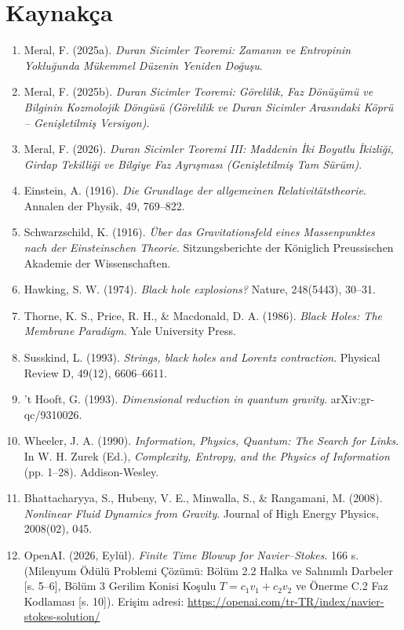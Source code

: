\documentclass[12pt,a4paper]{article}
\begin{document}
\section*{Kaynakça}

\begin{enumerate}
    \item Meral, F. (2025a). \textit{Duran Sicimler Teoremi: Zamanın ve Entropinin Yokluğunda Mükemmel Düzenin Yeniden Doğuşu}.
    \item Meral, F. (2025b). \textit{Duran Sicimler Teoremi: Görelilik, Faz Dönüşümü ve Bilginin Kozmolojik Döngüsü (Görelilik ve Duran Sicimler Arasındaki Köprü – Genişletilmiş Versiyon)}.
    \item Meral, F. (2026). \textit{Duran Sicimler Teoremi III: Maddenin İki Boyutlu İkizliği, Girdap Tekilliği ve Bilgiye Faz Ayrışması (Genişletilmiş Tam Sürüm)}.
    \item Einstein, A. (1916). \textit{Die Grundlage der allgemeinen Relativitätstheorie}. Annalen der Physik, 49, 769–822.
    \item Schwarzschild, K. (1916). \textit{Über das Gravitationsfeld eines Massenpunktes nach der Einsteinschen Theorie}. Sitzungsberichte der Königlich Preussischen Akademie der Wissenschaften.
    \item Hawking, S. W. (1974). \textit{Black hole explosions?} Nature, 248(5443), 30–31.
    \item Thorne, K. S., Price, R. H., \& Macdonald, D. A. (1986). \textit{Black Holes: The Membrane Paradigm}. Yale University Press.
    \item Susskind, L. (1993). \textit{Strings, black holes and Lorentz contraction}. Physical Review D, 49(12), 6606–6611.
    \item ’t Hooft, G. (1993). \textit{Dimensional reduction in quantum gravity}. arXiv:gr-qc/9310026.
    \item Wheeler, J. A. (1990). \textit{Information, Physics, Quantum: The Search for Links}. In W. H. Zurek (Ed.), \textit{Complexity, Entropy, and the Physics of Information} (pp. 1–28). Addison-Wesley.
    \item Bhattacharyya, S., Hubeny, V. E., Minwalla, S., \& Rangamani, M. (2008). \textit{Nonlinear Fluid Dynamics from Gravity}. Journal of High Energy Physics, 2008(02), 045.
    \item OpenAI. (2026, Eylül). \textit{Finite Time Blowup for Navier--Stokes}. 166 s. (Milenyum Ödülü Problemi Çözümü: Bölüm 2.2 Halka ve Salınımlı Darbeler [s. 5--6], Bölüm 3 Gerilim Konisi Koşulu $T = c_1 v_1 + c_2 v_2$ ve Önerme C.2 Faz Kodlaması [s. 10]). Erişim adresi: \url{https://openai.com/tr-TR/index/navier-stokes-solution/}

\end{enumerate}
\end{document}

